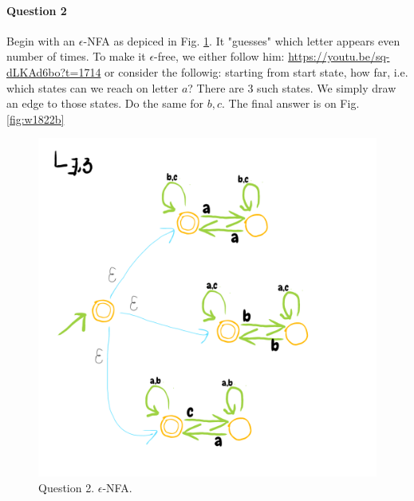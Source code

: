 \paragraph{Question 2}
Begin with an $\epsilon$-NFA as depiced in Fig. \ref{fig:w1822a}.
It "guesses" which letter appears even number of times.
To make it $\epsilon$-free, we either follow him: \url{https://youtu.be/sq-dLKAd6bo?t=1714} or consider the followig:
starting from start state, how far, i.e. which states can we reach on letter $a$?
There are $3$ such states.
We simply draw an edge to those states.
Do the same for $b,c$. 
The final answer is on Fig. \ref{fig:w1822b}
\begin{figure}[!h]
    \centering
    \includegraphics[scale=0.3]{data/2018-W-2-2a.png}
    \caption{Question 2.  $\epsilon$-NFA.}
    \label{fig:w1822a}
\end{figure}
